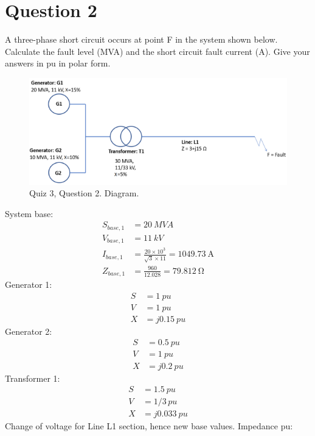 \section{Question 2}
A three-phase short circuit occurs at point F in the system shown below. Calculate the fault level (MVA) and the short circuit fault current (A). Give your answers in pu in polar form.
\begin{figure}[H]
    \centering
    \includegraphics[width = \textwidth]{img/figure154.png}
    \caption{Quiz 3, Question 2. Diagram.}
\end{figure}
System base:
\begin{align}
    S_{base,1} & = \SI{20}{MVA}                                                    \\
    V_{base,1} & = \SI{11}{kV}                                                     \\
    I_{base,1} & = \frac{20\times 10^3}{\sqrt{3}\times 11} = \SI{1049.73}{\ampere} \\
    Z_{base,1} & = \frac{960}{12.028} = \SI{79.812}{\ohm}
\end{align}
Generator 1:
\begin{align}
    S & = \SI{1}{pu}     \\
    V & = \SI{1}{pu}     \\
    X & = j\SI{0.15}{pu}
\end{align}
Generator 2:
\begin{align}
    S & = \SI{0.5}{pu}  \\
    V & = \SI{1}{pu}    \\
    X & = j\SI{0.2}{pu}
\end{align}
Transformer 1:
\begin{align}
    S & = \SI{1.5}{pu}    \\
    V & = 1/3\,\si{pu}    \\
    X & = j\SI{0.033}{pu}
\end{align}
Change of voltage for Line L1 section, hence new base values. Impedance pu:
